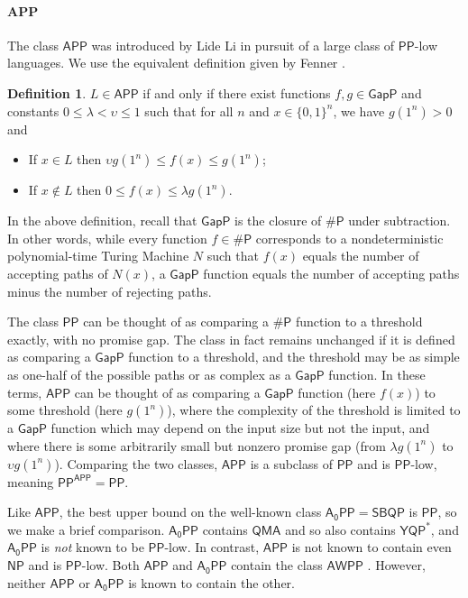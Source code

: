 \documentclass[11pt]{article}
\numberwithin{equation}{section}
\theoremstyle{definition}
\newtheorem{definition}[theorem]{Definition}
\theoremstyle{plain}
\newcommand{\class}[1]{\ensuremath{\mathsf{#1}}\xspace}
\newcommand{\NP}{\class{NP}}
\newcommand{\QMA}{\class{QMA}}
\newcommand{\GapP}{\class{GapP}}
\newcommand{\sharpP}{\class{\#P}}
\newcommand{\PP}{\class{PP}}
\newcommand{\YQPstar}{\class{YQP^*}}
\newcommand{\AWPP}{\class{AWPP}}
\newcommand{\APP}{\class{APP}}
\newcommand{\AzeroPP}{\class{A_{0}PP}}
\begin{document}
\paragraph{\texorpdfstring{$\mathsf{\mathbf{APP}}$}{APP}}
The class $\APP$ was introduced by
Lide %
%
Li \cite{li1993counting} in pursuit of
a large class of $\PP$-low languages.
We use the equivalent definition given by Fenner \cite[Corollary 3.7]{fenner2003pp}.

\begin{definition}\label{def:APP}
	$L\in \APP$ if and only if there exist
	functions $f,g\in \GapP$ and constants $0\leq \lambda < \upsilon \leq 1$ such that
	for all $n$ and $x\in\{0,1\}^n$,
	we have $g(1^n)>0$ and
	\begin{itemize}
		\item If $x\in L$ then
		$\upsilon g(1^n) \leq f(x) \leq g(1^n)$;
		\item If $x\notin L$ then $0\leq f(x) \leq \lambda g(1^n)$.
	\end{itemize}
\end{definition}

In the above definition, recall that $\GapP$ is the closure of $\sharpP$ under
subtraction.
In other words, while every function $f\in \sharpP$ corresponds to a nondeterministic
polynomial-time Turing Machine $N$ such that $f(x)$ equals the number of accepting paths
of $N(x)$,
a $\GapP$ function equals the number of accepting paths minus the number
of rejecting paths.

The class $\PP$ can be thought of as comparing a $\sharpP$ function
to a threshold exactly, with no promise gap.
The class in fact remains unchanged if it is defined as comparing a $\GapP$ function
to a threshold, and the threshold may be as simple as one-half of the possible paths or as complex as a
$\GapP$ function.
In these terms,
$\APP$ can be thought of as comparing a $\GapP$ function (here $f(x)$) to some threshold
(here $g(1^n)$),
where the complexity of the threshold is limited to a $\GapP$ function which may
depend on the input size but not the input,
and where there is some arbitrarily small but nonzero promise gap
(from $\lambda g(1^n)$ to $\upsilon g(1^n)$).
Comparing the two classes,
$\APP$ is a subclass of $\PP$ and is $\PP$-low, meaning $\PP^\APP = \PP$.

%
%
%
%
%
Like $\APP$, 
the best upper bound on the
well-known class $\AzeroPP=\class{SBQP}$ \cite{kuperberg2015hard}
is $\PP$,
so we make a brief comparison.
%
$\AzeroPP$ contains $\QMA$ \cite{vyalyi03}
and so also contains $\YQPstar$,
and $\AzeroPP$ is \emph{not} known to be $\PP$-low.
In contrast, $\APP$ is not known to contain even $\NP$ and is $\PP$-low.
Both $\APP$ and $\AzeroPP$ contain the class $\AWPP$ \cite{fenner2003pp,vyalyi03}.
However,
neither $\APP$ or $\AzeroPP$ is known to contain the other.
\end{document}
